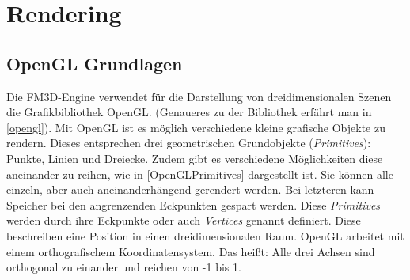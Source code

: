 \section[Rendering]{Rendering\cite{GLReference, OglDev, ThinMatrix, SparkyEngine, GLTut}}
\label{rendering}
\subsection{OpenGL Grundlagen}

Die FM3D-Engine verwendet für die Darstellung von dreidimensionalen Szenen die Grafikbibliothek OpenGL. (Genaueres zu der Bibliothek erfährt man in \cref{opengl}). Mit OpenGL ist es möglich verschiedene kleine grafische Objekte zu rendern. Dieses entsprechen drei geometrischen Grundobjekte (\textit{Primitives}): Punkte, Linien und Dreiecke. Zudem gibt es verschiedene Möglichkeiten diese aneinander zu reihen, wie in \cref{OpenGLPrimitives} dargestellt ist. Sie können alle einzeln, aber auch aneinanderhängend gerendert werden. Bei letzteren kann Speicher bei den angrenzenden Eckpunkten gespart werden. Diese \textit{Primitives} werden durch ihre Eckpunkte oder auch \textit{Vertices} genannt definiert. 
Diese beschreiben eine Position in einen dreidimensionalen Raum. OpenGL arbeitet mit einem orthografischem Koordinatensystem. Das heißt: Alle drei Achsen sind orthogonal zu einander und reichen von -1 bis 1.

